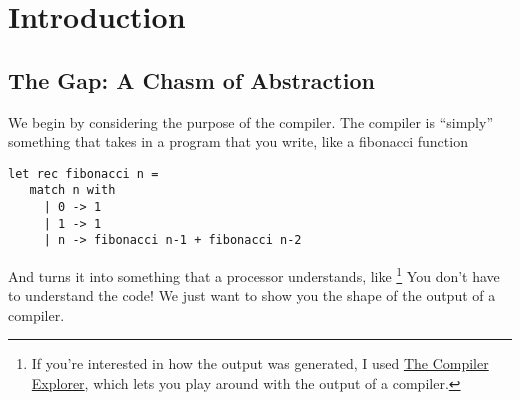 \chapter{Introduction}

\section{The Gap: A Chasm of Abstraction}
We begin by considering the purpose of the compiler. The compiler is ``simply'' something that takes in a program that you write, like a fibonacci function

\begin{code}
\label{code:fib-ocaml}
\begin{verbatim}
let rec fibonacci n = 
   match n with
     | 0 -> 1
     | 1 -> 1
     | n -> fibonacci n-1 + fibonacci n-2
\end{verbatim}
\end{code}

And turns it into something that a processor understands, like  \footnote{If you're interested in how the output was generated, I used \href{https://godbolt.org/}{The Compiler Explorer}, which lets you play around with the output of a compiler.} You don't have to understand the code! We just want to show you the shape of the output of a compiler.

